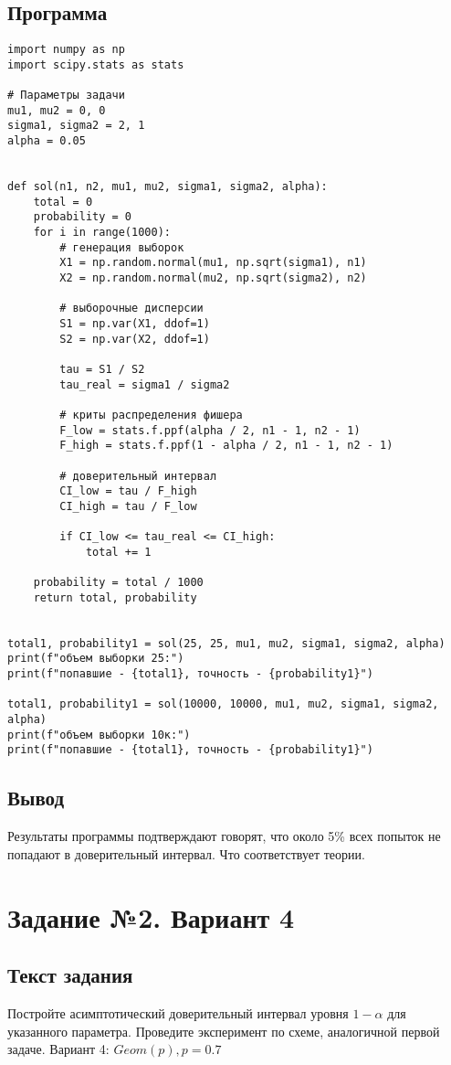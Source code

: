 \documentclass{article}
\begin{document}
\subsection{Программа}
\begin{verbatim}
import numpy as np
import scipy.stats as stats

# Параметры задачи
mu1, mu2 = 0, 0
sigma1, sigma2 = 2, 1
alpha = 0.05


def sol(n1, n2, mu1, mu2, sigma1, sigma2, alpha):
    total = 0
    probability = 0
    for i in range(1000):
        # генерация выборок
        X1 = np.random.normal(mu1, np.sqrt(sigma1), n1)
        X2 = np.random.normal(mu2, np.sqrt(sigma2), n2)

        # выборочные дисперсии
        S1 = np.var(X1, ddof=1)
        S2 = np.var(X2, ddof=1)

        tau = S1 / S2
        tau_real = sigma1 / sigma2

        # криты распределения фишера
        F_low = stats.f.ppf(alpha / 2, n1 - 1, n2 - 1)
        F_high = stats.f.ppf(1 - alpha / 2, n1 - 1, n2 - 1)

        # доверительный интервал
        CI_low = tau / F_high
        CI_high = tau / F_low

        if CI_low <= tau_real <= CI_high:
            total += 1

    probability = total / 1000
    return total, probability


total1, probability1 = sol(25, 25, mu1, mu2, sigma1, sigma2, alpha)
print(f"объем выборки 25:")
print(f"попавшие - {total1}, точность - {probability1}")

total1, probability1 = sol(10000, 10000, mu1, mu2, sigma1, sigma2, alpha)
print(f"объем выборки 10к:")
print(f"попавшие - {total1}, точность - {probability1}")
\end{verbatim}

\subsection{Вывод}
Результаты программы подтверждают говорят, что около 5\% всех попыток не попадают в доверительный интервал. Что соответствует теории.

\section{Задание №2. Вариант 4}
\subsection{Текст задания}
Постройте асимптотический доверительный интервал уровня $1 - \alpha$ для указанного параметра. Проведите эксперимент по схеме, аналогичной первой задаче.
Вариант 4:\newline
$Geom(p), p = 0.7$
\end{document}
